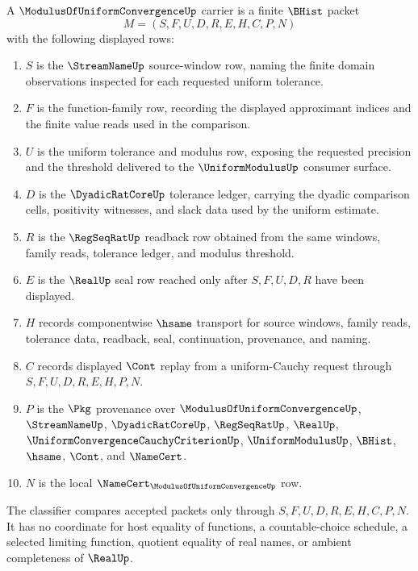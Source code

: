 \begin{definition}
\label{def:modulus-of-uniform-convergence-carrier}
A $\ModulusOfUniformConvergenceUp$ carrier is a finite $\BHist$ packet
$$
M=(S,F,U,D,R,E,H,C,P,N)
$$
with the following displayed rows:
\begin{enumerate}
\item $S$ is the $\StreamNameUp$ source-window row, naming the finite domain observations inspected for each requested uniform tolerance.
\item $F$ is the function-family row, recording the displayed approximant indices and the finite value reads used in the comparison.
\item $U$ is the uniform tolerance and modulus row, exposing the requested precision and the threshold delivered to the $\UniformModulusUp$ consumer surface.
\item $D$ is the $\DyadicRatCoreUp$ tolerance ledger, carrying the dyadic comparison cells, positivity witnesses, and slack data used by the uniform estimate.
\item $R$ is the $\RegSeqRatUp$ readback row obtained from the same windows, family reads, tolerance ledger, and modulus threshold.
\item $E$ is the $\RealUp$ seal row reached only after $S,F,U,D,R$ have been displayed.
\item $H$ records componentwise $\hsame$ transport for source windows, family reads, tolerance data, readback, seal, continuation, provenance, and naming.
\item $C$ records displayed $\Cont$ replay from a uniform-Cauchy request through $S,F,U,D,R,E,H,P,N$.
\item $P$ is the $\Pkg$ provenance over $\ModulusOfUniformConvergenceUp$, $\StreamNameUp$, $\DyadicRatCoreUp$, $\RegSeqRatUp$, $\RealUp$, $\UniformConvergenceCauchyCriterionUp$, $\UniformModulusUp$, $\BHist$, $\hsame$, $\Cont$, and $\NameCert$.
\item $N$ is the local $\NameCert_{\ModulusOfUniformConvergenceUp}$ row.
\end{enumerate}
The classifier compares accepted packets only through $S,F,U,D,R,E,H,C,P,N$. It has no coordinate for host equality of functions, a countable-choice schedule, a selected limiting function, quotient equality of real names, or ambient completeness of $\RealUp$.
\end{definition}

